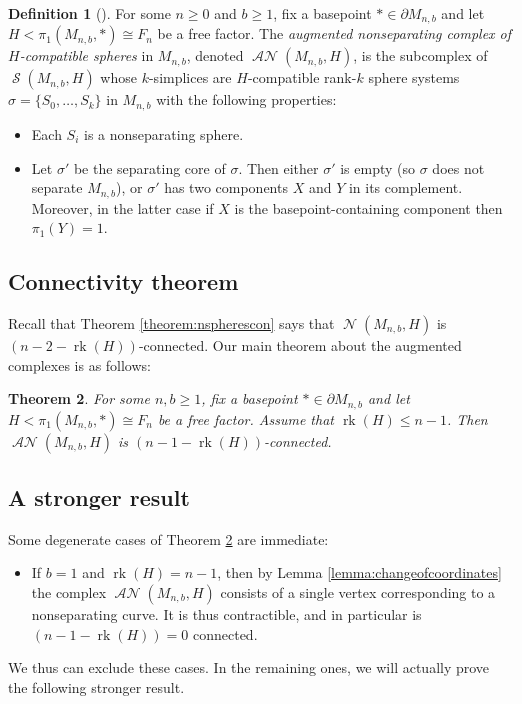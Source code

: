 \documentclass[11pt]{amsart}
\numberwithin{equation}{section}
\theoremstyle{plain}
\newtheorem{theorem}{Theorem}[section]
\theoremstyle{definition}
\newtheorem{defn}[theorem]{Definition}
\newenvironment{definition}[1][]{\begin{defn}[#1]\pushQED{\qed}}{\popQED \end{defn}}
\theoremstyle{remark}
\DeclareMathOperator{\rank}{rk}
\DeclareMathOperator{\Spheres}{\mathcal{S}}
\DeclareMathOperator{\NSpheres}{\mathcal{N}}
\DeclareMathOperator{\ANSpheres}{\mathcal{AN}}
\begin{document}
\begin{definition}
For some $n \geq 0$ and $b \geq 1$, fix a basepoint $\ast \in \partial M_{n,b}$
and let $H < \pi_1(M_{n,b},\ast) \cong F_n$ be a free factor.  The {\em augmented nonseparating complex of
$H$-compatible spheres} in $M_{n,b}$, denoted $\ANSpheres(M_{n,b},H)$, is
the subcomplex of $\Spheres(M_{n,b},H)$ whose $k$-simplices are $H$-compatible rank-$k$ sphere
systems $\sigma = \{S_0,\ldots,S_k\}$ in $M_{n,b}$ with the following properties:
\begin{itemize}
\item Each $S_i$ is a nonseparating sphere.
\item Let $\sigma'$ be the separating core of $\sigma$.  Then either $\sigma'$ is empty (so
$\sigma$ does not separate $M_{n,b}$), or $\sigma'$ has two components $X$ and $Y$ in
its complement.  Moreover, in the latter case if $X$ is the basepoint-containing component
then $\pi_1(Y) = 1$.\qedhere
\end{itemize}
\end{definition}

\subsection{Connectivity theorem}
Recall that Theorem \ref{theorem:nspherescon} says that $\NSpheres(M_{n,b},H)$ is $(n-2-\rank(H))$-connected.
Our main theorem about the augmented complexes is as follows:

\begin{theorem}
\label{theorem:nspheresredcon}
For some $n,b \geq 1$, fix a basepoint $\ast \in \partial M_{n,b}$
and let $H < \pi_1(M_{n,b},\ast) \cong F_n$ be a free factor.  Assume
that $\rank(H) \leq n-1$.  Then $\ANSpheres(M_{n,b},H)$
is $(n-1-\rank(H))$-connected.
\end{theorem}

\subsection{A stronger result}
Some degenerate cases of Theorem \ref{theorem:nspheresredcon} are immediate:
\begin{itemize}
\item If $b=1$ and $\rank(H) = n-1$, then by Lemma \ref{lemma:changeofcoordinates}
the complex $\ANSpheres(M_{n,b},H)$ consists of a single vertex
corresponding to a nonseparating curve.  It is thus contractible, and in particular is
$(n-1-\rank(H))=0$ connected.
\end{itemize}
We thus can exclude these cases.  In the remaining ones, we will actually prove the
following stronger result.
\end{document}

